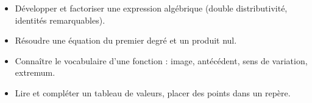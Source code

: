\documentclass[10pt,a4paper]{article}
\begin{document}

\vspace{-0.3cm}

\begin{prerequis}
\begin{itemize}
    \item Développer et factoriser une expression algébrique (double distributivité, identités remarquables).
    \item Résoudre une équation du premier degré et un produit nul.
    \item Connaître le vocabulaire d'une fonction : image, antécédent, sens de variation, extremum.
    \item Lire et compléter un tableau de valeurs, placer des points dans un repère.
\end{itemize}
\end{prerequis}
\end{document}
